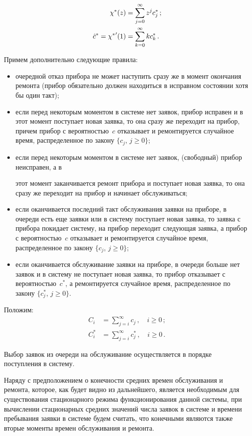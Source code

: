 \begin{multicols}{2}
\noindent
\begin{align*}
\chi^*(z)&=\sum\limits_{j=0}^{\infty} z^j c^*_j\,;\\
\hat c^*={\chi^*}'(1)&=\sum\limits_{k=0}^{\infty} k c^*_k\,.
\end{align*}


Примем дополнительно следующие правила:
\begin{itemize} %
\item очередной отказ прибора не может наступить сразу же в момент
окончания ремонта (прибор обязательно должен находиться в
исправном состоянии хотя бы один такт);
\item
если перед некоторым моментом в системе нет заявок, прибор
исправен и в этот момент поступает новая заявка, то она сразу же
переходит на прибор, причем прибор с вероятностью~$c$ отказывает
и ремонтируется случайное время, распределенное по закону
$\{c_j$, $j\ge 0\}$;
\item
если перед некоторым моментом в системе нет заявок, (свободный)
прибор неисправен, а в\linebreak\vspace*{-12pt}
\pagebreak

\noindent
 этот момент заканчивается ремонт прибора
и поступает новая заявка, то она сразу же переходит на прибор и
начинает обслуживаться;
\item
если оканчивается последний такт обслуживания заявки на приборе,
в очереди есть еще заявки или в систему поступает новая заявка,
то заявка с прибора покидает систему, на прибор переходит
следующая заявка, а прибор с вероятностью~$c$ отказывает и
ремонтируется случайное время, распределенное по закону
$\{c_j$, $j\ge 0\}$;
\item
если оканчивается обслуживание заявки на приборе, в очереди
больше нет заявок и в сис\-те\-му не поступает новая заявка, то
прибор отказывает с вероятностью~$c^*$, а ремонтируется случайное
время, распределенное по закону $\{c^*_j$, $j\ge 0\}$.
\end{itemize}

Положим:
\begin{align*}
C_i&=\sum_{j=i}^\infty c_j\,,
\quad i\ge 0\,;
\\
C^*_i&=\sum_{j=i}^\infty c^*_j\,,
\quad  i\ge 0\,.
\end{align*}


Выбор заявок из очереди на обслуживание осуществляется в
порядке поступления в систему.


Наряду с предположением о конечности средних времен
обслуживания и ремонта, которое, как будет видно из дальнейшего,
является необходимым для существования стационарного режима
функционирования данной сис\-те\-мы, при вычислении стационарных
средних значений числа заявок в сис\-те\-ме и времени пребывания
заявки в сис\-те\-ме будем считать, что конечными являются также
вторые моменты времен обслуживания и ремонта.


\end{multicols}
